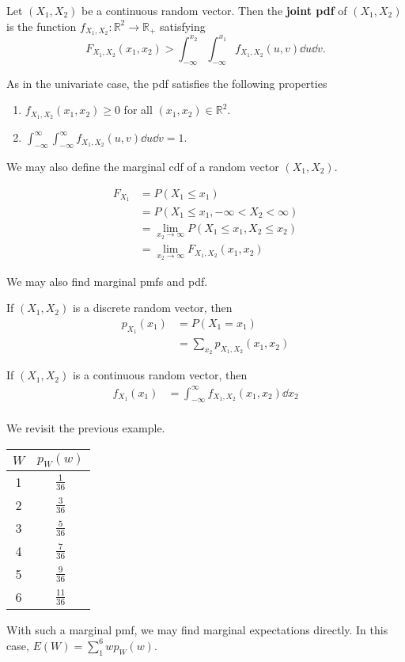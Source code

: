 \begin{definition}
	Let $(X_1,X_2)$ be a continuous random vector. Then the \textbf{joint pdf} of $(X_1,X_2)$ is the function $f_{X_1,X_2}:\mathbb R^2\to\mathbb R_+$ satisfying
	$$F_{X_1,X_2}(x_1,x_2)>\int_{-\infty}^{x_2}\int_{-\infty}^{x_1}f_{X_1,X_2}(u,v)\dd u\dd v.$$
\end{definition}

As in the univariate case, the pdf satisfies the following properties

\begin{enumerate}
	\item $f_{X_1,X_2}(x_1,x_2)\geq 0$ for all $(x_1,x_2)\in\mathbb R^2$.
	\item $\int_{-\infty}^{\infty}\int_{-\infty}^{\infty}f_{X_1,X_2}(u,v)\dd u\dd v=1$.
\end{enumerate}

We may also define the marginal cdf of a random vector $(X_1,X_2)$.

\begin{align*}
	F_{X_1}&=P(X_1\leq x_1)\\
	&=P(X_1\leq x_1,-\infty<X_2<\infty)\\
	&=\lim_{x_2\to\infty}P(X_1\leq x_1,X_2\leq x_2)\\
	&=\lim_{x_2\to\infty} F_{X_1,X_2}(x_1,x_2)
\end{align*}

We may also find marginal pmfs and pdf.

If $(X_1,X_2)$ is a discrete random vector, then
\begin{align*}
	p_{X_1}(x_1)&=P(X_1=x_1)\\
	&=\sum_{x_2}p_{X_1,X_2}(x_1,x_2)
\end{align*}

If $(X_1,X_2)$ is a continuous random vector, then
\begin{align*}
	f_{X_1}(x_1)&=\int_{-\infty}^{\infty}f_{X_1,X_2}(x_1,x_2)\dd{x_2}\\
\end{align*}

\begin{example}[]
	We revisit the previous example.

	\begin{center}
	\begin{tabular}{c | c}
		$W$ & $p_W(w)$\\ \hline
		1 & $\frac{1}{36}$\\
		2 & $\frac{3}{36}$\\
		3 & $\frac{5}{36}$\\
		4 & $\frac{7}{36}$\\
		5 & $\frac{9}{36}$\\
		6 & $\frac{11}{36}$
	\end{tabular}
	\end{center}

	With such a marginal pmf, we may find marginal expectations directly. In this case, $E(W)=\sum_1^6wp_W(w)$.
\end{example}


